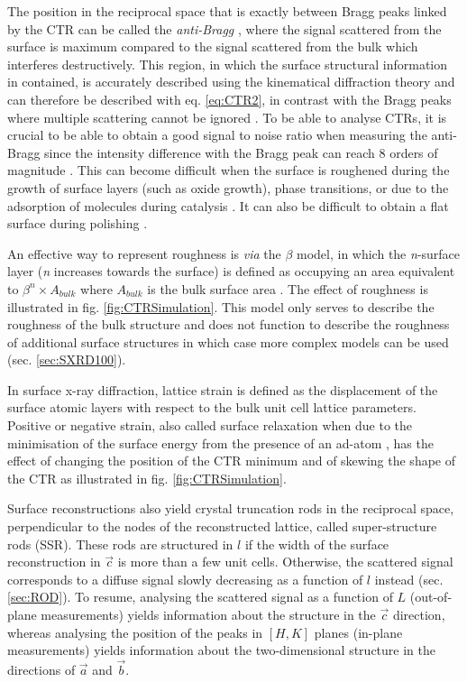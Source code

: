 The position in the reciprocal space that is exactly between Bragg peaks linked by the CTR can be called the \textit{anti-Bragg} \parencite{Robinson1991}, where the signal scattered from the surface is maximum compared to the signal scattered from the bulk which interferes destructively.
This region, in which the surface structural information in contained, is accurately described using the kinematical diffraction theory and can therefore be described with eq. \ref{eq:CTR2}, in contrast with the Bragg peaks where multiple scattering cannot be ignored \parencite{Kaganer2007}.
To be able to analyse CTRs, it is crucial to be able to obtain a good signal to noise ratio when measuring the anti-Bragg since the intensity difference with the Bragg peak can reach 8 orders of magnitude \parencite{Fadenberger2010}.
This can become difficult when the surface is roughened during the growth of surface layers (such as oxide growth), phase transitions, or due to the adsorption of molecules during catalysis \parencite{Zhdanov1997, Zhdanov1998}.
It can also be difficult to obtain a flat surface during polishing \parencite{Musket1982}.

An effective way to represent roughness is \textit{via} the $\beta$ model, in which the \textit{n}-surface layer (\textit{n} increases towards the surface) is defined as occupying an area equivalent to $\beta^n \times A_{bulk}$ where $A_{bulk}$ is the bulk surface area \parencite{Robinson1986}.
The effect of roughness is illustrated in fig. \ref{fig:CTRSimulation}.
This model only serves to describe the roughness of the bulk structure and does not function to describe the roughness of additional surface structures in which case more complex models can be used (sec. \ref{sec:SXRD100}).

In surface x-ray diffraction, lattice strain is defined as the displacement of the surface atomic layers with respect to the bulk unit cell lattice parameters.
Positive or negative strain, also called surface relaxation when due to the minimisation of the surface energy from the presence of an ad-atom \parencite{Gupta1981}, has the effect of changing the position of the CTR minimum and of skewing the shape of the CTR as illustrated in fig. \ref{fig:CTRSimulation}.

Surface reconstructions also yield crystal truncation rods in the reciprocal space, perpendicular to the nodes of the reconstructed lattice, called super-structure rods (SSR).
These rods are structured in $l$ if the width of the surface reconstruction in $\vec{c}$ is more than a few unit cells.
Otherwise, the scattered signal corresponds to a diffuse signal slowly decreasing as a function of $l$ instead (sec. \ref{sec:ROD}).
To resume, analysing the scattered signal as a function of $L$ (out-of-plane measurements) yields information about the structure in the $\vec{c}$ direction, whereas analysing the position of the peaks in $[H, K]$ planes (in-plane measurements) yields information about the two-dimensional structure in the directions of $\vec{a}$ and $\vec{b}$.


